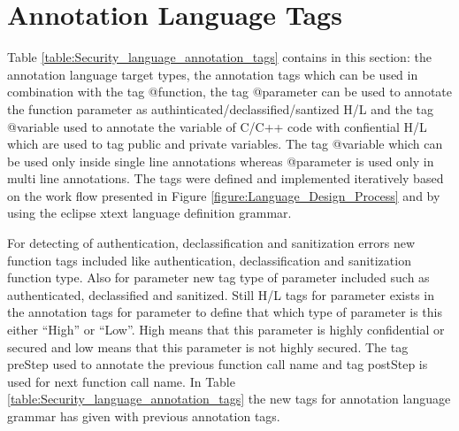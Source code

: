 \section{Annotation Language Tags}
Table \ref{table:Security_language_annotation_tags} contains in this section: the annotation language
target types, the annotation tags which can be used in
combination with the tag @function, the tag
@parameter can be used to annotate the function parameter as authinticated/declassified/santized H/L and the tag @variable used to annotate the variable of C/C++ code with confiential H/L which are used to tag public and private variables. The tag @variable which can be used only inside single line annotations whereas @parameter is used only in multi line annotations. The tags were
defined and implemented iteratively based on the work flow
presented in Figure \ref{figure:Language_Design_Process} and by using the eclipse xtext \cite{ref_17_xtext:grammar} language
definition grammar.

For detecting of authentication, declassification and sanitization errors new function tags included like authentication, declassification and sanitization function type. Also for parameter new tag type of parameter included such as authenticated, declassified and sanitized. Still H/L tags for parameter exists in the annotation tags for parameter to define that which type of parameter is this either \enquote{High} or \enquote{Low}. High means that this parameter is highly confidential or secured and low means that this parameter is not highly secured. The tag preStep used to annotate the previous function call name and tag postStep is used for next function call name. In Table \ref{table:Security_language_annotation_tags} the new tags for annotation language grammar has given with previous \cite{ref_108_paul2015infoflow} annotation tags. 

